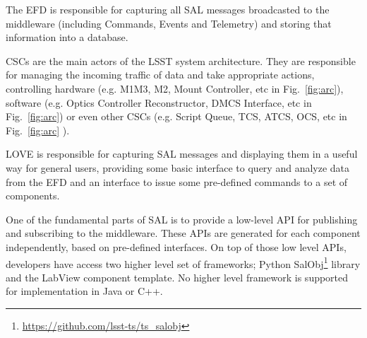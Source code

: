 The EFD is responsible for capturing all SAL messages broadcasted to the middleware (including Commands, Events and Telemetry) and storing that information into a database. 

CSCs are the main actors of the LSST system architecture. They are responsible for managing the incoming traffic of data and take appropriate actions, controlling hardware (e.g. M1M3, M2, Mount Controller, etc in Fig.~\ref{fig:arc}), software (e.g. Optics Controller Reconstructor, DMCS Interface, etc in Fig.~\ref{fig:arc}) or even other CSCs (e.g. Script Queue, TCS, ATCS, OCS, etc in Fig.~\ref{fig:arc} ).

LOVE is responsible for capturing SAL messages and displaying them in a useful way for general users, providing some basic interface to query and analyze data from the EFD and an interface to issue some pre-defined commands to a set of components.

One of the fundamental parts of SAL is to provide a low-level API for publishing and subscribing to the middleware. These APIs are generated for each component independently, based on pre-defined interfaces. On top of those low level APIs, developers have access two higher level set of frameworks; Python SalObj\footnote{\url{https://github.com/lsst-ts/ts_salobj}} library and the LabView component template. No higher level framework is supported for implementation in Java or C++. 




